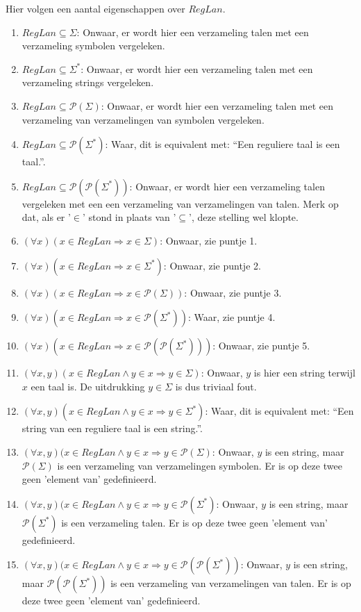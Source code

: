\documentclass[main.tex]{subfiles}
\begin{document}
\begin{ei}
  Hier volgen een aantal eigenschappen over $RegLan$.
  \begin{enumerate}
  \item $RegLan \subseteq \Sigma$: Onwaar, er wordt hier een verzameling talen met een verzameling symbolen vergeleken.
  \item $RegLan \subseteq \Sigma^{*}$: Onwaar, er wordt hier een verzameling talen met een verzameling strings vergeleken.
  \item $RegLan \subseteq \mathcal P(\Sigma)$: Onwaar, er wordt hier een verzameling talen met een verzameling van verzamelingen van symbolen vergeleken.
  \item $RegLan \subseteq \mathcal P(\Sigma^{*})$: Waar, dit is equivalent met: ``Een reguliere taal is een taal.''.
  \item $RegLan \subseteq \mathcal P(\mathcal P(\Sigma^{*}))$: Onwaar, er wordt hier een verzameling talen vergeleken met een een verzameling van verzamelingen van talen. Merk op dat, als er '$\in$' stond in plaats van '$\subseteq$', deze stelling wel klopte.
  \item $(\forall x)(x \in RegLan \Rightarrow x \in \Sigma)$: Onwaar, zie puntje 1.
  \item $(\forall x)(x \in RegLan \Rightarrow x \in \Sigma^{*})$: Onwaar, zie puntje 2.
  \item $(\forall x)(x \in RegLan \Rightarrow x \in \mathcal P(\Sigma))$: Onwaar, zie puntje 3.
  \item $(\forall x)(x \in RegLan \Rightarrow x \in \mathcal P(\Sigma^{*}))$: Waar, zie puntje 4.
  \item $(\forall x)(x \in RegLan \Rightarrow x \in \mathcal P(\mathcal P(\Sigma^{*})))$: Onwaar, zie puntje 5.
  \item $(\forall x,y)(x \in RegLan \wedge y \in x \Rightarrow y \in \Sigma)$: Onwaar, $y$ is hier een string terwijl $x$ een taal is. De uitdrukking $y \in \Sigma$ is dus triviaal fout.
  \item $(\forall x,y)(x \in RegLan \wedge y \in x \Rightarrow y \in \Sigma^{*})$: Waar, dit is equivalent met: ``Een string van een reguliere taal is een string.''.
  \item $(\forall x,y)(x \in RegLan \wedge y \in x \Rightarrow y \in \mathcal P(\Sigma)$: Onwaar, $y$ is een string, maar $\mathcal P(\Sigma)$ is een verzameling van verzamelingen symbolen. Er is op deze twee geen 'element van' gedefinieerd.
  \item $(\forall x,y)(x \in RegLan \wedge y \in x \Rightarrow y \in \mathcal P(\Sigma^{*})$: Onwaar, $y$ is een string, maar $\mathcal P(\Sigma^{*})$ is een verzameling talen. Er is op deze twee geen 'element van' gedefinieerd.
  \item $(\forall x,y)(x \in RegLan \wedge y \in x \Rightarrow y \in \mathcal P(\mathcal P(\Sigma^{*}))$: Onwaar, $y$ is een string, maar $\mathcal P(\mathcal P(\Sigma^{*}))$ is een verzameling van verzamelingen van talen. Er is op deze twee geen 'element van' gedefinieerd.
  \end{enumerate}
\end{ei}
\end{document}
